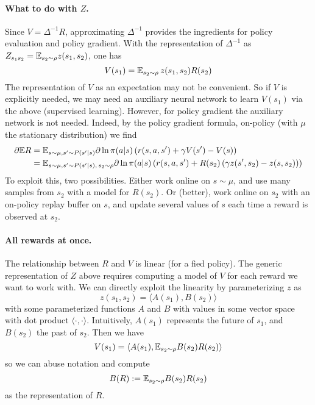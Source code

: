 \documentclass[11pt,a4paper]{article}
\begin{document}
\paragraph{What to do with $Z$.} Since $V=\Delta^{-1}R$, approximating
$\Delta^{-1}$ provides the ingredients for policy evaluation and policy
gradient. With the representation of $\Delta^{-1}$ as
$Z_{s_1s_2}=\mathbb{E}_{s_2\sim \rho} z(s_1,s_2)$, one has
\begin{equation}
V(s_1)=\mathbb{E}_{s_2\sim \rho}\, z(s_1,s_2) R(s_2)
\end{equation}
The representation of $V$ as an expectation may not be convenient. So if
$V$ is explicitly needed, we may need an auxiliary neural network to
learn $V(s_1)$ via the above (supervised learning). However, for policy
gradient the auxiliary network is not needed. Indeed, by the policy
gradient formula, on-policy (with $\mu$ the stationary distribution) we find
\begin{align}
\partial \mathbb{E} R&=
\mathbb{E}_{s\sim \mu,s'\sim P(s'|s)} \partial \ln
\pi(a|s) \left(
r(s,a,s')+\gamma V(s')-V(s)
\right)
\\&=
\mathbb{E}_{s\sim \mu,s'\sim P(s'|s),\,s_2\sim \rho} \partial \ln
\pi(a|s) \left(
r(s,a,s')+R(s_2)\left(\gamma z(s',s_2)-z(s,s_2)\right)
\right)
\end{align}
To exploit this, two possibilities. Either work online on $s\sim \mu$,
and use many samples from $s_2$ with a model for $R(s_2)$. Or (better),
work online on $s_2$ with an on-policy replay buffer on $s$, and update
several values of $s$ each time a reward is observed at $s_2$.

\paragraph{All rewards at once.} The relationship between $R$ and $V$ is
linear (for a fied policy). The generic representation of $Z$ above
requires computing a model of $V$ for each reward we want to work with.
We can directly exploit the linearity by parameterizing $z$ as
\begin{equation}
z(s_1,s_2)=\langle A(s_1),B(s_2)\rangle
\end{equation}
with some parameterized functions $A$ and $B$ with values in some vector
space with dot product $\langle\cdot,\cdot\rangle$. Intuitively, $A(s_1)$
represents the future of $s_1$, and $B(s_2)$ the past of $s_2$.
Then we have
\begin{equation}
V(s_1)=\langle A(s_1),\mathbb{E}_{s_2\sim \rho} B(s_2)R(s_2)\rangle
\end{equation}
so we can abuse notation and compute
\begin{equation}
B(R)\mathrel{\mathop{:}}= \mathbb{E}_{s_2\sim \rho} B(s_2)R(s_2)
\end{equation}
as the representation of $R$.
\end{document}
